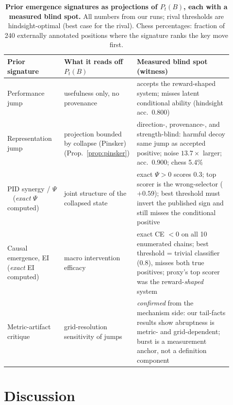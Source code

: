 \documentclass[11pt]{article}
\theoremstyle{definition}
\begin{document}
\begin{table}[t]
\centering\small
\caption{\textbf{Prior emergence signatures as projections of
$P_t(B)$, each with a measured blind spot.} All numbers from our runs;
rival thresholds are hindsight-optimal (best case for the rival).
Chess percentages: fraction of 240 externally annotated positions
where the signature ranks the key move first.}
\label{tab:unification}
\begin{tabular}{>{\raggedright\arraybackslash}p{0.25\linewidth} >{\raggedright\arraybackslash}p{0.25\linewidth} >{\raggedright\arraybackslash}p{0.42\linewidth}}
\toprule
\textbf{Prior signature} & \textbf{What it reads off $P_t(B)$} & \textbf{Measured blind spot (witness)} \\
\midrule
Performance jump~\cite{wei2022} & usefulness only, no provenance &
accepts the reward-shaped system; misses latent conditional ability
(hindsight acc.\ 0.800) \\
\addlinespace[2pt]
Representation jump & projection bounded by collapse (Pinsker)
(Prop.~\ref{prop:pinsker}) & direction-, provenance-, and
strength-blind: harmful decoy same jump as accepted positive; noise
$13.7\times$ larger; acc.\ 0.900; chess 5.4\% \\
\addlinespace[2pt]
PID synergy / $\Psi$~\cite{rosas2020} (\emph{exact} $\Psi$ computed) &
joint structure of the collapsed state & exact $\Psi>0$ scores 0.3;
top scorer is the wrong-selector ($+0.59$); best threshold must invert
the published sign and still misses the conditional positive \\
\addlinespace[2pt]
Causal emergence, EI~\cite{hoel2013} (\emph{exact} EI computed) &
macro intervention efficacy & exact CE $<0$ on all 10
enumerated chains; best threshold = trivial classifier (0.8), misses
both true positives; proxy's top scorer was the reward-\emph{shaped}
system \\
\addlinespace[2pt]
Metric-artifact critique~\cite{schaeffer2023} & grid-resolution
sensitivity of jumps & \emph{confirmed} from the mechanism side: our
tail-facts results show abruptness is metric- and grid-dependent;
burst is a measurement anchor, not a definition component \\
\bottomrule
\end{tabular}
\end{table}

\section{Discussion}
\end{document}
